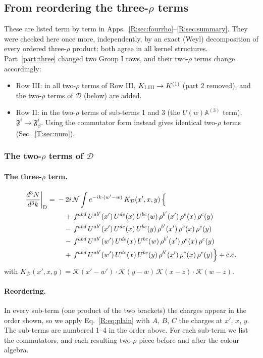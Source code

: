 \documentclass[10pt]{article}
\numberwithin{equation}{section}
\newcommand{\KK}{\mathcal K}
\newcommand{\NN}{\mathcal N}
\begin{document}
\subsection{From reordering the three-\texorpdfstring{$\rho$}{rho} terms}\label{T:sec:three}
These are listed term by term in Apps.~\ref{R:sec:fourrho}--\ref{R:sec:summary}. They were checked here once more, independently, by an exact (Weyl) decomposition of every ordered three-$\rho$ product: both agree in all kernel structures. Part~\ref{part:three} changed two Group I rows, and their two-$\rho$ terms change accordingly:
\begin{itemize}
\item Row III: in all two-$\rho$ terms of Row III, $K_{\rm I.III}\to K^{(1)}$ (part 2 removed), and the two-$\rho$ terms of $\mathcal D$ (below) are added.
\item Row II: in the two-$\rho$ terms of sub-terms 1 and 3 (the $U(w)\mathbb A^{(3)}$ term), $\mathfrak F^i\to\mathfrak F^i_\beta$. Using the commutator form instead gives identical two-$\rho$ terms (Sec.~\ref{T:sec:num}).
\end{itemize}
\subsubsection*{The two-$\rho$ terms of $\mathcal D$}\label{T:sec:D}

\paragraph{The three-$\rho$ term.}
\begin{align}
\frac{d^3N}{d^3k}\bigg|_{\rm D}={}&-2i\,\NN\int e^{-ik\cdot(w'-w)}\,K_{\mathcal D}(x',x,y)\,\Big\{\notag\\
&\quad +\,f^{abd}\,U^{ab'}(x')\,U^{de}(x)\,U^{bc}(w)\,\rho^{b'}(x')\,\rho^{e}(x)\,\rho^{c}(y)\notag\\
&\quad -\,f^{abd}\,U^{ab'}(x')\,U^{de}(x)\,U^{bc}(y)\,\rho^{b'}(x')\,\rho^{e}(x)\,\rho^{c}(y)\notag\\
&\quad -\,f^{abd}\,U^{ab'}(w')\,U^{de}(x)\,U^{bc}(w)\,\rho^{b'}(x')\,\rho^{e}(x)\,\rho^{c}(y)\notag\\
&\quad +\,f^{abd}\,U^{ab'}(w')\,U^{de}(x)\,U^{bc}(y)\,\rho^{b'}(x')\,\rho^{e}(x)\,\rho^{c}(y)\Big\}+{\rm c.c.}\label{T:eq:in-D}
\end{align}
with $K_{\mathcal D}(x',x,y)=\KK(x'-w')\cdot\KK(y-w)\,\KK(x-z)\cdot\KK(w-z)$.
\paragraph{Reordering.} In every sub-term (one product of the two brackets) the charges appear in the order shown, so we apply Eq.~\eqref{R:eq:plain} with $A$, $B$, $C$ the charges at $x'$, $x$, $y$. The sub-terms are numbered 1--4 in the order above. For each sub-term we list the commutators, and each resulting two-$\rho$ piece before and after the colour algebra.
\end{document}
